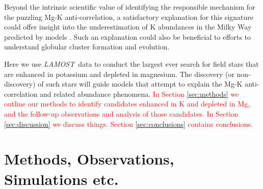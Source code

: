 \documentclass[a4paper,fleqn,usenatbib]{mnras}
\newcommand{\todo}[1]{\textcolor{red}{#1}}
\newcommand{\LamostGiants}{454180}
\newcommand{\project}[1]{\emph{#1}}
\newcommand{\lamost}{\project{LAMOST}}
\begin{document}

Beyond the intrinsic scientific value of identifying the responsible mechanism for the puzzling Mg-K anti-correlation, a satisfactory explanation for this signature could offer insight into the underestimation of K abundances in the Milky Way predicted by models \citep{kobayashi2011}. Such an explanation could also be beneficial to efforts to understand globular cluster formation and evolution.

Here we use \lamost\ data to conduct the largest ever search for field stars that are enhanced in potassium and depleted in magnesium. The discovery (or non-discovery) of such stars will guide models that attempt to explain the Mg-K anti-correlation and related abundance phenomena. \todo{In Section \ref{sec:methods} we outline our methods to identify candidates enhanced in K and depleted in Mg, and the follow-up observations and analysis of those candidates. In Section \ref{sec:discussion} we discuss things. Section \ref{sec:conclusions} contains conclusions.}




\section{Methods, Observations, Simulations etc.}
\end{document}
